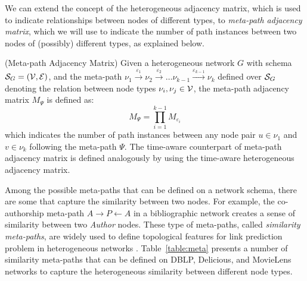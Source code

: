 We can extend the concept of the heterogeneous adjacency matrix, which is used to indicate relationships between nodes of different types, to \emph{meta-path adjacency matrix}, which we will use to indicate the number of path instances between two nodes of (possibly) different types, as explained below.

\begin{definition}{(Meta-path Adjacency Matrix)}
Given a heterogeneous network $G$ with schema $\mathcal{S}_G=(\mathcal{V}, \mathcal{E})$, and the meta-path $\nu_1\xrightarrow{\varepsilon_1}\nu_2\xrightarrow{\varepsilon_2}\dots\nu_{k-1}\xrightarrow{\varepsilon_{k-1}}\nu_k$ defined over $\mathcal{S}_G$ denoting the relation between node types $\nu_i,\nu_j\in\mathcal{V}$, the meta-path adjacency matrix $M_{\Psi}$ is defined as:
\[M_\Psi=\prod_{i=1}^{k-1}M_{\varepsilon_i}\]
which indicates the number of path instances between any node pair $u\in\nu_1$ and $v\in\nu_k$ following the meta-path $\Psi$. The time-aware counterpart of meta-path adjacency matrix is defined analogously by using the time-aware heterogeneous adjacency matrix.
\end{definition}


Among the possible meta-paths that can be defined on a network schema, there are some that capture the similarity between two nodes. For example, the co-authorship meta-path $A\rightarrow P\leftarrow A$ in a bibliographic network creates a sense of similarity between two \emph{Author} nodes. These type of meta-paths, called \emph{similarity meta-paths}, are widely used to define topological features for link prediction problem in heterogeneous networks \cite{sun2011co, zhang2014meta, 7752228}. Table~\ref{table:meta} presents a number of similarity meta-paths that can be defined on DBLP, Delicious, and MovieLens networks to capture the heterogeneous similarity between different node types.

